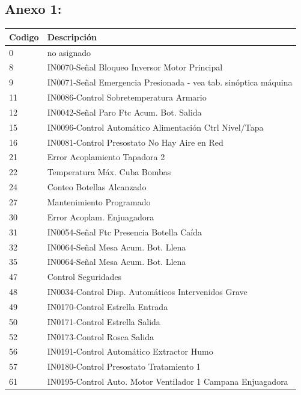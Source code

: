 \documentclass[10pt]{article}
\begin{document}
\subsection{Anexo 1:}
\begin{table}[!ht]
    \centering
    \begin{tabular}{|l|l|}
    \hline
        Codigo & Descripción \\ \hline
        0 & no asignado \\ \hline
        8 & IN0070-Señal Bloqueo Inversor Motor Principal \\ \hline
        9 & IN0071-Señal Emergencia Presionada - vea tab. sinóptica máquina \\ \hline
        11 & IN0086-Control Sobretemperatura Armario \\ \hline
        12 & IN0042-Señal Paro Ftc Acum. Bot. Salida \\ \hline
        15 & IN0096-Control Automático Alimentación Ctrl Nivel/Tapa \\ \hline
        16 & IN0081-Control Presostato No Hay Aire en Red \\ \hline
        21 & Error Acoplamiento Tapadora 2 \\ \hline
        22 & Temperatura Máx. Cuba Bombas \\ \hline
        24 & Conteo Botellas Alcanzado \\ \hline
        27 & Mantenimiento Programado \\ \hline
        30 & Error Acoplam. Enjuagadora \\ \hline
        31 & IN0054-Señal Ftc Presencia Botella Caí­da \\ \hline
        32 & IN0064-Señal Mesa Acum. Bot. Llena \\ \hline
        35 & IN0064-Señal Mesa Acum. Bot. Llena \\ \hline
        47 & Control Seguridades \\ \hline
        48 & IN0034-Control Disp. Automáticos Intervenidos Grave \\ \hline
        49 & IN0170-Control Estrella Entrada \\ \hline
        50 & IN0171-Control Estrella Salida \\ \hline
        52 & IN0173-Control Rosca Salida \\ \hline
        56 & IN0191-Control Automático Extractor Humo \\ \hline
        57 & IN0180-Control Presostato Tratamiento 1 \\ \hline
        61 & IN0195-Control Auto. Motor Ventilador 1 Campana Enjuagadora \\ \hline

\end{tabular}
\end{table}
\end{document}
